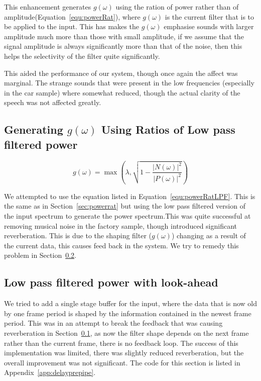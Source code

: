 \documentclass[11pt]{article} %
\begin{document}
{This enhancement generates $g(\omega)$ using the ration of power rather than of amplitude(Equation~\ref{equ:powerRat}), where $g(\omega)$ is the current filter that is to be applied to the input. This has makes the $g(\omega)$ emphasise sounds with larger amplitude much more than those with small amplitude, if we assume that the signal amplitude is always significantly more than that of the noise, then this helps the selectivity of the filter quite significantly. 

This aided the performance of our system, though once again the affect was marginal. The strange sounds that were present in the low frequencies (especially in the car sample) where somewhat reduced, though the actual clarity of the speech was not affected greatly.

\subsection{Generating $g(\omega)$ Using Ratios of Low pass filtered power} 
\label{sec:powerratLPF}
\begin{equation}
\label{equ:powerRatLPF}
	g(\omega) = \max\left(\lambda, \sqrt{1- \frac{\lvert N(\omega) \rvert ^{2}}{\lvert P(\omega) \rvert ^{2}}}\right)
\end{equation}

We attempted to use the equation listed in Equation~\ref{equ:powerRatLPF}. This is the same as in Section~\ref{sec:powerrat} but using the low pass filtered version of the input spectrum to generate the power spectrum.This was quite successful at removing musical noise in the factory sample, though introduced significant reverberation. This is due to the shaping filter ($g(\omega)$) changing as a result of the current data, this causes feed back in the system. We try to remedy this problem in Section~\ref{sec:delayprepipe}.

\subsection{Low pass filtered power with look-ahead}
\label{sec:delayprepipe}

We tried to add a single stage buffer for the input, where the data that is now old by one frame period is shaped by the information contained in the newest frame period. This was in an attempt to break the feedback that was causing reverberation in Section~\ref{sec:powerratLPF}, as now the filter shape depends on the next frame rather than the current frame, there is no feedback loop. The success of this implementation was limited, there was slightly reduced reverberation, but the overall improvement was not significant. The code for this section is listed in Appendix~\ref{app:delayprepipe}.

}
\end{document}
